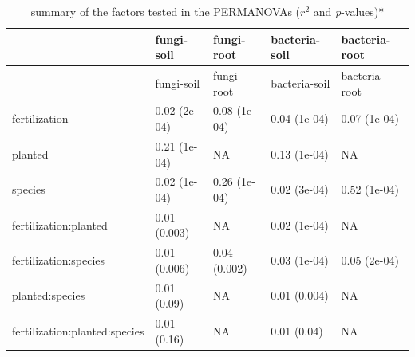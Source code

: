 \documentclass[11pt,]{article}
\begin{document}
\begin{longtable}[]{@{}lllll@{}}
\caption{summary of the factors tested in the PERMANOVAs (\(r^2\) and
\emph{p}-values)*}\tabularnewline
\toprule
& fungi-soil & fungi-root & bacteria-soil & bacteria-root\tabularnewline
\midrule
\endfirsthead
\toprule
& fungi-soil & fungi-root & bacteria-soil & bacteria-root\tabularnewline
\midrule
\endhead
fertilization & 0.02 (2e-04) & 0.08 (1e-04) & 0.04 (1e-04) & 0.07
(1e-04)\tabularnewline
planted & 0.21 (1e-04) & NA & 0.13 (1e-04) & NA\tabularnewline
species & 0.02 (1e-04) & 0.26 (1e-04) & 0.02 (3e-04) & 0.52
(1e-04)\tabularnewline
fertilization:planted & 0.01 (0.003) & NA & 0.02 (1e-04) &
NA\tabularnewline
fertilization:species & 0.01 (0.006) & 0.04 (0.002) & 0.03 (1e-04) &
0.05 (2e-04)\tabularnewline
planted:species & 0.01 (0.09) & NA & 0.01 (0.004) & NA\tabularnewline
fertilization:planted:species & 0.01 (0.16) & NA & 0.01 (0.04) &
NA\tabularnewline
\bottomrule
\end{longtable}
\end{document}
